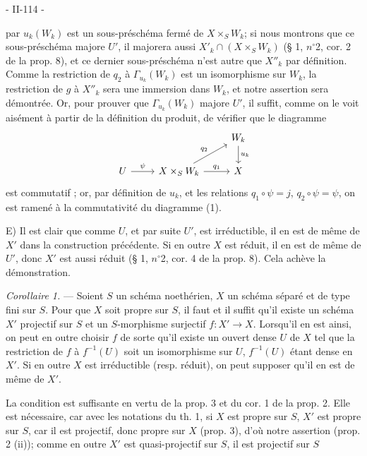 \newpage


\noindent - II-114 -

\noindent par $u_k(W_k)$ est un sous-préschéma fermé de $X \times_S W_k$; si nous montrons que ce sous-préschéma majore $U'$, il majorera aussi $X'_k \cap (X \times_S W_k)$ (§ 1, $n^\circ$2, cor. 2 de la prop. 8), et ce dernier sous-préschéma n'est autre que $X''_k$ par définition. Comme la restriction de $q_2$ à $\Gamma_{u_k}(W_k)$ est un isomorphisme sur $W_k$, la restriction de $g$ à $X''_k$ sera une immersion dans $W_k$, et notre assertion sera démontrée. Or, pour prouver que $\Gamma_{u_k}(W_k)$ majore $U'$, il suffit, comme on le voit aisément à partir de la définition du produit, de vérifier que le diagramme
$$\begin{tikzcd}
& & W_k \arrow[d, "u_k"] \\
U \arrow[r, "\psi"] & X \times_S W_k \arrow[ur, "q_2"] \arrow[r, "q_1"] & X
\end{tikzcd}$$
est commutatif ; or, par définition de $u_k$, et les relations $q_1 \circ \psi = j$, $q_2 \circ \psi = \psi$, on est ramené à la commutativité du diagramme (1).

\noindent E) Il est clair que comme $U$, et par suite $U'$, est irréductible, il en est de même de $X'$ dans la construction précédente. Si en outre $X$ est réduit, il en est de même de $U'$, donc $X'$ est aussi réduit (§ 1, $n^\circ$2, cor. 4 de la prop. 8). Cela achève la démonstration.

\noindent \emph{Corollaire 1.} — Soient $S$ un schéma noethérien, $X$ un schéma séparé et de type fini sur $S$. Pour que $X$ soit propre sur $S$, il faut et il suffit qu'il existe un schéma $X'$ projectif sur $S$ et un $S$-morphisme surjectif $f : X' \to X$. Lorsqu'il en est ainsi, on peut en outre choisir $f$ de sorte qu'il existe un ouvert dense $U$ de $X$ tel que la restriction de $f$ à $f^{-1}(U)$ soit un isomorphisme sur $U$, $f^{-1}(U)$ étant dense en $X'$. Si en outre $X$ est irréductible (resp. réduit), on peut supposer qu'il en est de même de $X'$.

\noindent La condition est suffisante en vertu de la prop. 3 et du cor. 1 de la prop. 2. Elle est nécessaire, car avec les notations du th. 1, si $X$ est propre sur $S$, $X'$ est propre sur $S$, car il est projectif, donc propre sur $X$ (prop. 3), d'où notre assertion (prop. 2 (ii)); comme en outre $X'$ est quasi-projectif sur $S$, il est projectif sur $S$

\newpage

